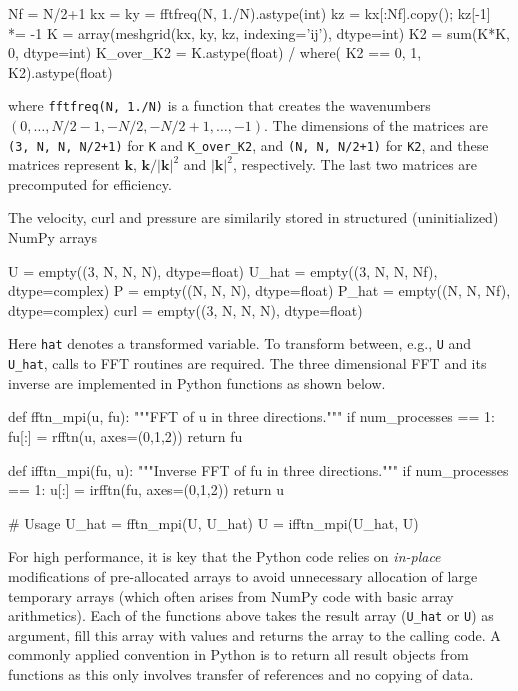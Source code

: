 \documentclass[final,3p,times,twocolumn]{elsarticle}
\newcommand{\inpyth}{\lstinline[style=inlinestyle]} %[]%
\begin{document}
\noindent
\begin{minipage}[l]{\columnwidth}
\begin{python}
Nf = N/2+1
kx = ky = fftfreq(N, 1./N).astype(int)
kz = kx[:Nf].copy(); kz[-1] *= -1
K = array(meshgrid(kx, ky, kz, 
          indexing='ij'), dtype=int)
K2 = sum(K*K, 0, dtype=int)
K_over_K2 = K.astype(float) / where(
            K2 == 0, 1, K2).astype(float)
\end{python}
\end{minipage}
where \inpyth{fftfreq(N, 1./N)} is a function that creates the wavenumbers $(0, 
\ldots, N/2-1, -N/2, -N/2+1, \ldots, -1)$. The dimensions of the matrices are 
\inpyth{(3, N, N, N/2+1)} for \texttt{K} and \texttt{K\_over\_K2}, and 
\inpyth{(N, N, N/2+1)} for \texttt{K2}, and these matrices represent $\bm{k}$, 
$\bm{k}/|\bm{k}|^2$ and $|\bm{k}|^2$, respectively. The last two matrices are 
precomputed for efficiency.

The velocity, curl and pressure are similarily stored in structured 
(uninitialized) NumPy arrays

\begin{python}
U     = empty((3, N, N, N),  dtype=float)
U_hat = empty((3, N, N, Nf), dtype=complex)
P     = empty((N, N, N),     dtype=float)
P_hat = empty((N, N, Nf),    dtype=complex)
curl  = empty((3, N, N, N),  dtype=float)
\end{python}
Here \inpyth{hat} denotes a transformed variable. To transform between, e.g., 
\inpyth{U} and \inpyth{U_hat}, calls to FFT routines are required. The three 
dimensional FFT and its inverse are implemented in Python functions as shown 
below.

\begin{python}
def fftn_mpi(u, fu):
    """FFT of u in three directions."""
    if num_processes == 1:   
        fu[:] = rfftn(u, axes=(0,1,2))
    return fu

def ifftn_mpi(fu, u):
    """Inverse FFT of fu in three directions."""
    if num_processes == 1:
        u[:] = irfftn(fu, axes=(0,1,2))
    return u

# Usage
U_hat = fftn_mpi(U, U_hat)
U = ifftn_mpi(U_hat, U)
\end{python}
For high performance, it is key that the Python code relies on \emph{in-place}
modifications of pre-allocated arrays to avoid unnecessary allocation of
large temporary arrays (which often arises from NumPy code with basic array 
arithmetics). 
Each of the functions above takes the result array (\texttt{U\_hat} or
\texttt{U}) as argument, fill this array with values and returns the
array to the calling code. A commonly applied convention in
Python is to return all result objects from functions as this only involves
transfer of references and no copying of data.
\end{document}
